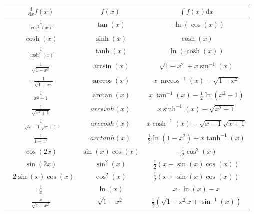 \documentclass[paper=a3,paper=landscape, fontsize=9pt, DIV=30]{scrartcl}
\begin{document}
\begin{multicols*}{4}
		\bgroup
		\def\arraystretch{4}
        \begin{tabular}{|c|c|c|}
          \hline
           $\frac{\mathrm d}{\mathrm d x}  f(x)$  				& $f(x)$				& $\int f(x) \mathrm{d}x$   					\\
          \hline
           $\frac{1}{\cos^2(x)}$                                & $\tan(x)$         	& $-\ln(\cos(x))$                           	\\ %
           $\cosh(x) $ 											& $\sinh(x)$ 			& $\cosh(x)$									\\
           $\frac{1}{\cosh^2(x)}$                               & $\tanh(x)$        	& $\ln(\cosh(x))$                           	\\ %
           $\frac{1}{\sqrt{1-x^2}}$                             & $\arcsin(x)$      	& $\sqrt{1-x^2}+x \sin^{-1}(x)$             	\\ %
           $-\frac{1}{\sqrt{1-x^2}}$                            & $\arccos(x)$      	& $x \ \arccos^{-1}(x)-\sqrt{1-x^2}$        	\\ %
           $\frac{1}{x^2+1}$                                    & $\arctan(x)$      	& $x \ \tan^{-1}(x)-\frac{1}{2}\ln(x^2+1)$  	\\ %
           $\frac{1}{\sqrt{x^2+1}}$                             & $arcsinh(x)$      	& $x \sinh^{-1}(x)-\sqrt{x^2+1}$            	\\ %
           $\frac{1}{\sqrt{x-1}\sqrt{x+1}}$                     & $arccosh(x)$      	& $x \cosh^{-1}(x)-\sqrt{x-1}\sqrt{x+1}$    	\\ %
           $\frac{1}{1-x^2}$                                    & $arctanh(x)$      	& $\frac{1}{2} \ln(1-x^2)+x \tanh^{-1}(x)$ 		\\ %
           $\cos(2x)$                                           & $\sin(x)\cos(x)$   	& $-\frac{1}{2}\cos^2(x)$                    	\\ %
            $\sin(2x)$                                          & $\sin^2(x)$       	& $\frac{1}{2}(x-\sin(x)\cos(x))$             	\\ %
           $-2\sin(x)\cos(x)$                                  	& $\cos^2(x)$       	& $\frac{1}{2}(x+\sin(x)\cos(x))$             	\\ %
           $\frac{1}{x}$                                       	& $\ln(x)$          	& $x \cdot \ln(x)-x$                         	\\ %
           $\frac{x}{\sqrt{1-x^2}}$                        		& $\sqrt{1-x^2}$   		& $\frac{1}{2}(\sqrt{1-x^2}x+\sin^{-1}(x))$ 	\\
           \hline
        \end{tabular}
		\egroup
		

\end{multicols*}
\end{document}
